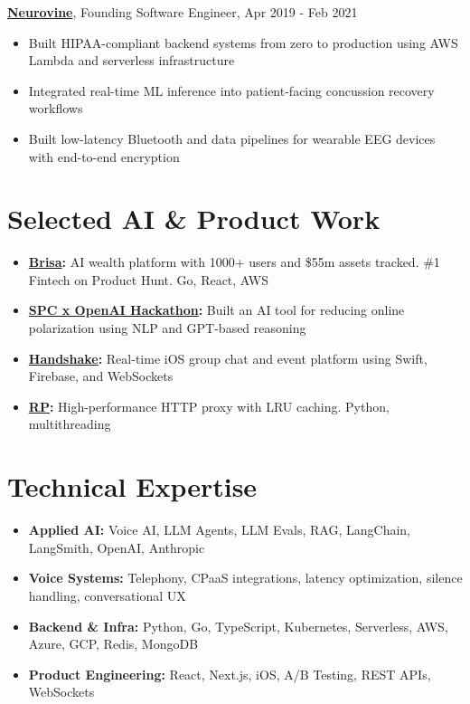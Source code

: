\documentclass[9pt]{article}
\begin{document}
\noindent
\textbf{\href{https://neurovine.ai}{Neurovine}}, Founding Software Engineer, Apr 2019 - Feb 2021
\begin{itemize}
    \setlength\itemsep{0em}
    \item Built HIPAA-compliant backend systems from zero to production using AWS Lambda and serverless infrastructure
    \item Integrated real-time ML inference into patient-facing concussion recovery workflows
    \item Built low-latency Bluetooth and data pipelines for wearable EEG devices with end-to-end encryption
\end{itemize}

\section*{Selected AI \& Product Work}

\begin{itemize}
    \setlength\itemsep{0em}
    \item \textbf{\href{https://joinbrisa.com}{Brisa}:} AI wealth platform with 1000+ users and \$55m assets tracked. \#1 Fintech on Product Hunt. Go, React, AWS
    \item \textbf{\href{https://x.com/tomas_hk/status/1764725667130991022}{SPC x OpenAI Hackathon}:} Built an AI tool for reducing online polarization using NLP and GPT-based reasoning
    \item \textbf{\href{https://github.com/boshd/handshake}{Handshake}:} Real-time iOS group chat and event platform using Swift, Firebase, and WebSockets
    \item \textbf{\href{https://github.com/boshd/rp}{RP}:} High-performance HTTP proxy with LRU caching. Python, multithreading
\end{itemize}

\section*{Technical Expertise}
\begin{itemize}
    \setlength\itemsep{0em}
    \item \textbf{Applied AI:} Voice AI, LLM Agents, LLM Evals, RAG, LangChain, LangSmith, OpenAI, Anthropic
    \item \textbf{Voice Systems:} Telephony, CPaaS integrations, latency optimization, silence handling, conversational UX
    \item \textbf{Backend \& Infra:} Python, Go, TypeScript, Kubernetes, Serverless, AWS, Azure, GCP, Redis, MongoDB
    \item \textbf{Product Engineering:} React, Next.js, iOS, A/B Testing, REST APIs, WebSockets
\end{itemize}
\end{document}
